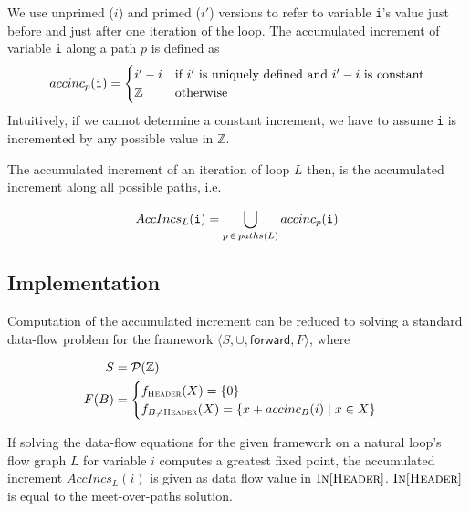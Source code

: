 \begin{definition}
We use unprimed ($i$) and primed ($i'$) versions to refer to variable \verb!i!'s value just before and just after one iteration of the loop. The accumulated increment of variable \verb!i! along a path $p$ is defined as 
\[
    accinc_p(\verb!i!) =
        \begin{cases}
        i' - i & \text{if } i' \text{ is uniquely defined and } i' - i \text{ is constant}\\
        \mathbb{Z} & \text{otherwise}
        \end{cases}
\]
Intuitively, if we cannot determine a constant increment, we have to assume \texttt{i} is incremented by any possible value in $\mathbb{Z}$.

\end{definition}
\begin{definition}
    The accumulated increment of an iteration of loop $L$ then, is the accumulated increment along all possible paths, i.e.
    
    \[ AccIncs_L(\verb!i!) = \bigcup \limits_{p \,\in\, paths(L)} accinc_p(\verb!i!) \]
\end{definition}

\subsection{Implementation}

Computation of the accumulated increment can be reduced to solving a standard data-flow problem for the framework $\langle S, \cup, \textsf{forward}, F \rangle$, where

\begin{align}
    S &= \mathcal{P}(\mathbb{Z}) \\
    F(B) &= \begin{cases}
        f_{\textsc{Header}}(X) = \{ 0 \} \\
        f_{B \ne \textsc{Header}}(X) = \{ x + accinc_B(i) \mid x \in X \} \label{eq:accinc_func_fam}
    \end{cases}
\end{align}

\begin{theorem}
    If solving the data-flow equations for the given framework on a natural loop's flow graph $L$ for variable $i$ computes a greatest fixed point, the accumulated increment $AccIncs_L(i)$ is given as data flow value in $\textsc{In}[\textsc{Header}]$. $\textsc{In}[\textsc{Header}]$ is equal to the meet-over-paths solution.
\end{theorem}

